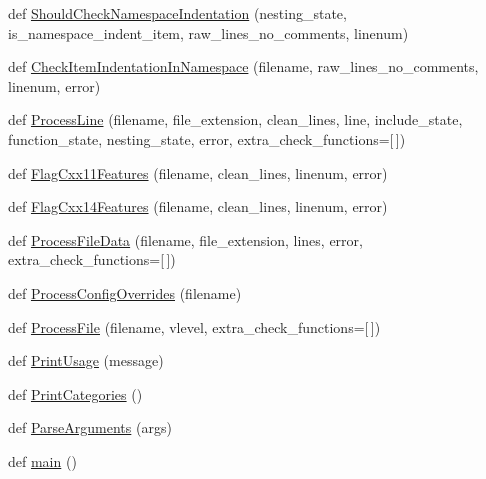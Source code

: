 \begin{DoxyCompactItemize}
\item 
def \hyperlink{namespacecpplint_aaaeb792789007d86b0898676c00caa72}{Should\+Check\+Namespace\+Indentation} (nesting\+\_\+state, is\+\_\+namespace\+\_\+indent\+\_\+item, raw\+\_\+lines\+\_\+no\+\_\+comments, linenum)
\item 
def \hyperlink{namespacecpplint_ac8e3b4340d0d83c8b2e7b199597b29a0}{Check\+Item\+Indentation\+In\+Namespace} (filename, raw\+\_\+lines\+\_\+no\+\_\+comments, linenum, error)
\item 
def \hyperlink{namespacecpplint_ac7c198c2adf60fd79a3f2b4270055a3b}{Process\+Line} (filename, file\+\_\+extension, clean\+\_\+lines, line, include\+\_\+state, function\+\_\+state, nesting\+\_\+state, error, extra\+\_\+check\+\_\+functions=\mbox{[}$\,$\mbox{]})
\item 
def \hyperlink{namespacecpplint_a386f43855367cc82348b0e2834e5cdc0}{Flag\+Cxx11\+Features} (filename, clean\+\_\+lines, linenum, error)
\item 
def \hyperlink{namespacecpplint_a744a4eecd461be0235779b03d34d6daf}{Flag\+Cxx14\+Features} (filename, clean\+\_\+lines, linenum, error)
\item 
def \hyperlink{namespacecpplint_ace3e46f0fab9638ad0e786037a5ca96c}{Process\+File\+Data} (filename, file\+\_\+extension, lines, error, extra\+\_\+check\+\_\+functions=\mbox{[}$\,$\mbox{]})
\item 
def \hyperlink{namespacecpplint_a6b67f01b8b199f5f6a7481fc0fb53878}{Process\+Config\+Overrides} (filename)
\item 
def \hyperlink{namespacecpplint_a41785091b61e8719f4a4a886eb20fe43}{Process\+File} (filename, vlevel, extra\+\_\+check\+\_\+functions=\mbox{[}$\,$\mbox{]})
\item 
def \hyperlink{namespacecpplint_a57542503fc1cce3e5c7171fc32d6ba05}{Print\+Usage} (message)
\item 
def \hyperlink{namespacecpplint_a3b1a047aa772a0d7d049d29c8ee62aba}{Print\+Categories} ()
\item 
def \hyperlink{namespacecpplint_a57476f6a7321d342db7b7ca98d80bd27}{Parse\+Arguments} (args)
\item 
def \hyperlink{namespacecpplint_a03dd39c6bfb4337676fcfaf5cd797c91}{main} ()
\end{DoxyCompactItemize}
